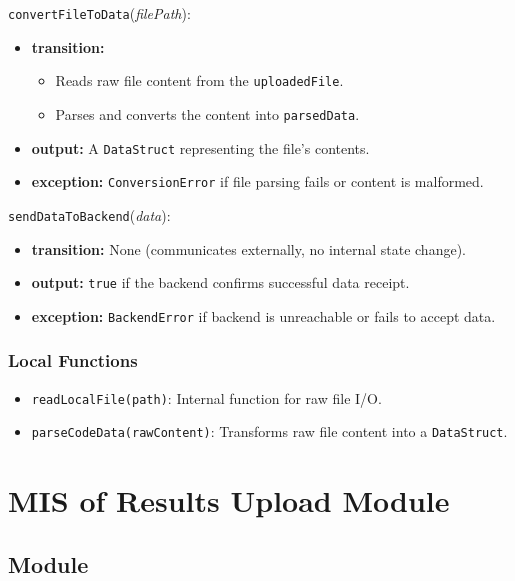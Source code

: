 \documentclass[12pt, titlepage]{article}
\begin{document}
\noindent \texttt{convertFileToData}(\textit{filePath}):
\begin{itemize}
    \item \textbf{transition:}
    \begin{itemize}
        \item Reads raw file content from the \texttt{uploadedFile}.
        \item Parses and converts the content into \texttt{parsedData}.
    \end{itemize}
    \item \textbf{output:} A \texttt{DataStruct} representing the file’s contents.
    \item \textbf{exception:} \texttt{ConversionError} if file parsing fails or content is malformed.
\end{itemize}

\noindent \texttt{sendDataToBackend}(\textit{data}):
\begin{itemize}
    \item \textbf{transition:} None (communicates externally, no internal state change).
    \item \textbf{output:} \texttt{true} if the backend confirms successful data receipt.
    \item \textbf{exception:} \texttt{BackendError} if backend is unreachable or fails to accept data.
\end{itemize}

\subsubsection{Local Functions}

\begin{itemize}
    \item \texttt{readLocalFile(path)}: Internal function for raw file I/O.
    \item \texttt{parseCodeData(rawContent)}: Transforms raw file content into a \texttt{DataStruct}.
\end{itemize}

\section{MIS of Results Upload Module} \label{mResultsUpload}

\subsection{Module}
\end{document}
